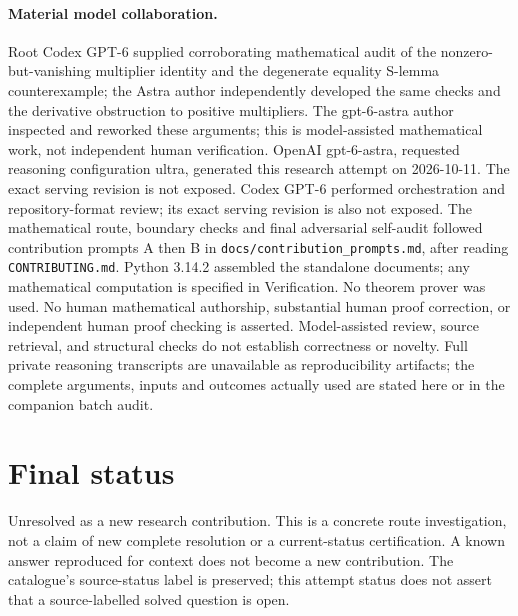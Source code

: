 \documentclass[11pt]{article}
\begin{document}
\paragraph{Material model collaboration.} Root Codex GPT-6 supplied corroborating mathematical audit of the nonzero-but-vanishing multiplier identity and the degenerate equality S-lemma counterexample; the Astra author independently developed the same checks and the derivative obstruction to positive multipliers. The gpt-6-astra author inspected and reworked these arguments; this is model-assisted mathematical work, not independent human verification.
OpenAI gpt-6-astra, requested reasoning configuration ultra, generated this research
attempt on 2026-10-11. The exact serving revision is not exposed. Codex GPT-6
performed orchestration and repository-format review; its exact serving revision
is also not exposed. The mathematical route, boundary checks and final adversarial
self-audit followed contribution prompts A then B in
\texttt{docs/contribution\_prompts.md}, after reading \texttt{CONTRIBUTING.md}.
Python 3.14.2 assembled the standalone documents; any mathematical computation is
specified in Verification. No theorem prover was used. No human mathematical
authorship, substantial human proof correction, or independent human proof checking
is asserted. Model-assisted review, source retrieval, and structural checks do not
establish correctness or novelty. Full private reasoning transcripts are unavailable
as reproducibility artifacts; the complete arguments, inputs and outcomes actually
used are stated here or in the companion batch audit.
\section{Final status}
Unresolved as a new research contribution. This is a concrete route investigation,
not a claim of new complete resolution or a current-status certification. A known
answer reproduced for context does not become a new contribution. The catalogue's
source-status label is preserved; this attempt status does not assert that a
source-labelled solved question is open.
\end{document}
